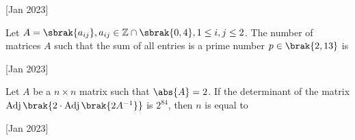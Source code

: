  \hfill [Jan 2023]

 \item Let $A = \sbrak{a_{ij}}, a_{ij} \in \mathbb{Z} \cap \sbrak{0,4}, 1 \leq i,j \leq 2$. 
The number of matrices $A$ such that the sum of all entries is a prime number $p \in \brak{2,13}$ is 

\hfill [Jan 2023]

\item Let $A$ be a $n \times n $ matrix such that $\abs{A} = 2$. If the determinant of the matrix $\operatorname{Adj}\brak{2\cdot \operatorname{Adj}\brak{2A^{-1}}}$ is $2^{84}$, then $n$ is equal to 

\hfill [Jan 2023]